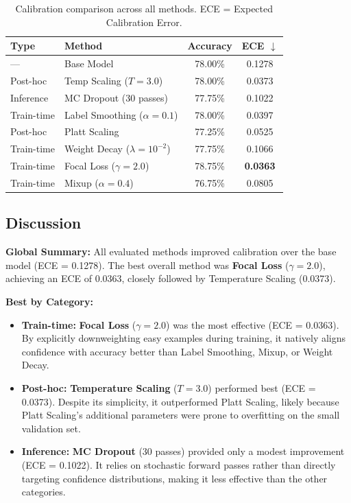 \begin{table}[h]
\centering
\begin{tabular}{l l c c}
\toprule
\textbf{Type} & \textbf{Method} & \textbf{Accuracy} & \textbf{ECE $\downarrow$} \\
\midrule
--- & Base Model & 78.00\% & 0.1278 \\
\midrule
Post-hoc & Temp Scaling ($T\!=\!3.0$) & 78.00\% & 0.0373 \\
Inference & MC Dropout (30 passes) & 77.75\% & 0.1022 \\
Train-time & Label Smoothing ($\alpha\!=\!0.1$) & 78.00\% & 0.0397 \\
\midrule
Post-hoc & Platt Scaling & 77.25\% & 0.0525 \\
Train-time & Weight Decay ($\lambda\!=\!10^{-2}$) & 77.75\% & 0.1066 \\
Train-time & Focal Loss ($\gamma\!=\!2.0$) & 78.75\% & \textbf{0.0363} \\
Train-time & Mixup ($\alpha\!=\!0.4$) & 76.75\% & 0.0805 \\
\bottomrule
\end{tabular}
\caption{Calibration comparison across all methods. ECE = Expected Calibration Error.}
\label{tab:calibration_results}
\end{table}

\subsection*{Discussion}

\textbf{Global Summary:} All evaluated methods improved calibration over the base model (ECE = 0.1278). The best overall method was \textbf{Focal Loss} ($\gamma\!=\!2.0$), achieving an ECE of 0.0363, closely followed by Temperature Scaling (0.0373).

\textbf{Best by Category:}
\begin{itemize}
    \item \textbf{Train-time:} \textbf{Focal Loss} ($\gamma\!=\!2.0$) was the most effective (ECE = 0.0363). By explicitly downweighting easy examples during training, it natively aligns confidence with accuracy better than Label Smoothing, Mixup, or Weight Decay.
    \item \textbf{Post-hoc:} \textbf{Temperature Scaling} ($T\!=\!3.0$) performed best (ECE = 0.0373). Despite its simplicity, it outperformed Platt Scaling, likely because Platt Scaling's additional parameters were prone to overfitting on the small validation set.
    \item \textbf{Inference:} \textbf{MC Dropout} (30 passes) provided only a modest improvement (ECE = 0.1022). It relies on stochastic forward passes rather than directly targeting confidence distributions, making it less effective than the other categories.
\end{itemize}

